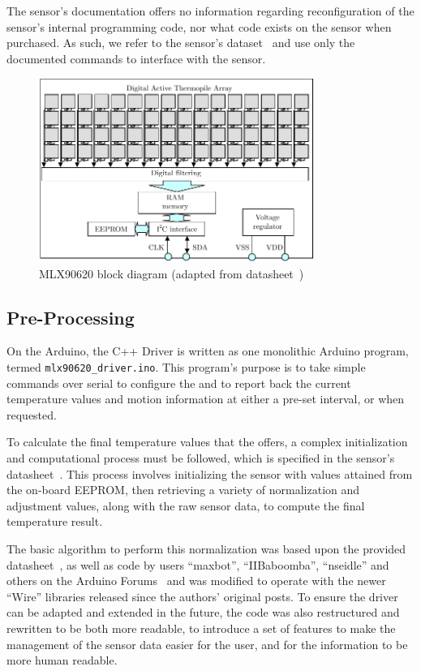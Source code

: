 \documentclass[../thesis/thesis.tex]{subfiles}
\begin{document}
The sensor's documentation offers no information regarding reconfiguration of the sensor's internal programming code, nor what code exists on the sensor when purchased. As such, we refer to the sensor's dataset~\cite{MLXDatasheet} and use only the documented commands to interface with the sensor.

\begin{figure}
\centering
\includegraphics[width=0.8\textwidth]{../diagrams/mlx-block-diagram.pdf}
\caption{MLX90620 block diagram (adapted from datasheet~\cite{MLXDatasheet})}
\label{fig:exps:blockdia}
\end{figure}

\subsection{Pre-Processing}

On the Arduino, the \tarl C++ Driver is written as one monolithic Arduino program, termed \texttt{mlx90620\_driver.ino}. This program's purpose is to take simple commands over serial to configure the \mlx and to report back the current temperature values and \pir motion information at either a pre-set interval, or when requested.

To calculate the final temperature values that the \mlx offers, a complex initialization and computational process must be followed, which is specified in the sensor's datasheet~\cite{MLXDatasheet}. This process involves initializing the sensor with values attained from the on-board EEPROM, then retrieving a variety of normalization and adjustment values, along with the raw sensor data, to compute the final temperature result.

The basic algorithm to perform this normalization was based upon the provided datasheet~\cite{MLXDatasheet}, as well as code by users ``maxbot'', ``IIBaboomba'', ``nseidle'' and others on the Arduino Forums~\cite{ArduinoForum} and was modified to operate with the newer \ard ``Wire'' \iic libraries released since the authors' original posts. To ensure the driver can be adapted and extended in the future, the code was also restructured and rewritten to be both more readable, to introduce a set of features to make the management of the sensor data easier for the user, and for the information to be more human readable.
\end{document}
